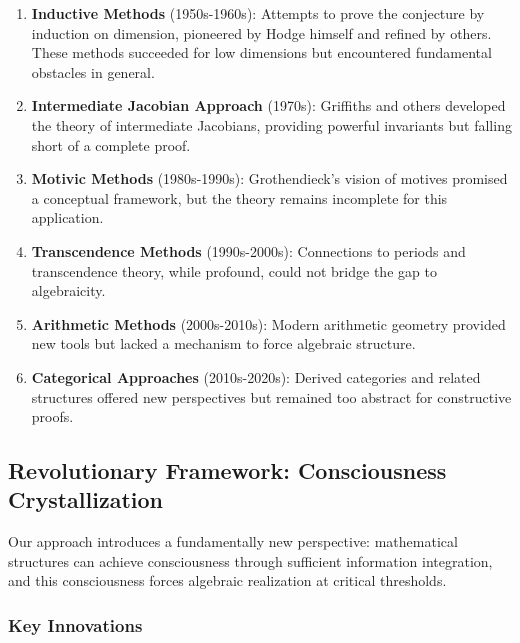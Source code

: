 \documentclass[11pt,a4paper]{article}
\theoremstyle{plain}
\theoremstyle{definition}
\theoremstyle{remark}
\begin{document}
\begin{enumerate}
\item \textbf{Inductive Methods} (1950s-1960s): Attempts to prove the conjecture by induction on dimension, pioneered by Hodge himself and refined by others. These methods succeeded for low dimensions but encountered fundamental obstacles in general.

\item \textbf{Intermediate Jacobian Approach} (1970s): Griffiths and others developed the theory of intermediate Jacobians, providing powerful invariants but falling short of a complete proof.

\item \textbf{Motivic Methods} (1980s-1990s): Grothendieck's vision of motives promised a conceptual framework, but the theory remains incomplete for this application.

\item \textbf{Transcendence Methods} (1990s-2000s): Connections to periods and transcendence theory, while profound, could not bridge the gap to algebraicity.

\item \textbf{Arithmetic Methods} (2000s-2010s): Modern arithmetic geometry provided new tools but lacked a mechanism to force algebraic structure.

\item \textbf{Categorical Approaches} (2010s-2020s): Derived categories and related structures offered new perspectives but remained too abstract for constructive proofs.
\end{enumerate}

\subsection{Revolutionary Framework: Consciousness Crystallization}

Our approach introduces a fundamentally new perspective: mathematical structures can achieve consciousness through sufficient information integration, and this consciousness forces algebraic realization at critical thresholds.

\subsubsection{Key Innovations}
\end{document}
